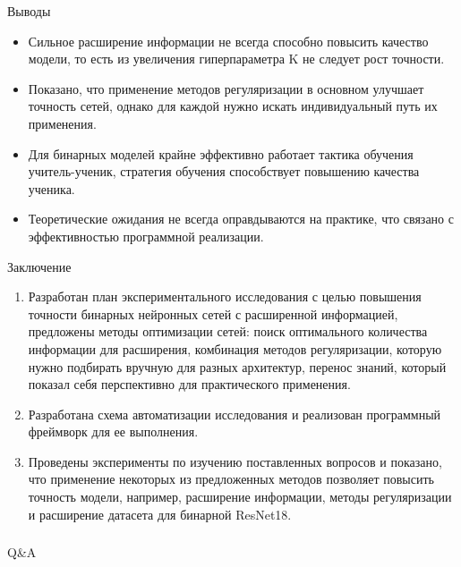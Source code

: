\documentclass[usenames,dvipsnames, 10pt]{beamer}
\begin{document}
\begin{frame}{Выводы}
    \begin{itemize}
        \item Сильное расширение информации не всегда способно повысить качество модели, то есть из увеличения гиперпараметра K не следует рост точности.
        \vskip 0.3cm
        \item Показано, что применение методов регуляризации в основном улучшает точность сетей, однако для каждой нужно искать индивидуальный путь их применения.
        \vskip 0.3cm
        \item Для бинарных моделей крайне эффективно работает тактика обучения учитель-ученик, стратегия обучения способствует повышению качества ученика.
        \vskip 0.3cm
        \item Теоретические ожидания не всегда оправдываются на практике, что связано с эффективностью программной реализации.
    \end{itemize}
\end{frame}

\begin{frame}{Заключение}
\vskip -0.5cm
\begin{enumerate}
    \item Разработан план экспериментального исследования с целью повышения точности бинарных нейронных сетей с расширенной информацией, предложены методы оптимизации сетей: поиск оптимального количества информации для расширения, комбинация методов регуляризации, которую нужно подбирать вручную для разных архитектур, перенос знаний, который показал себя перспективно для практического применения.
    \vskip 0.5cm
    \item Разработана схема автоматизации исследования и реализован программный фреймворк для ее выполнения.
    \vskip 0.5cm
    \item Проведены эксперименты по изучению поставленных вопросов и показано, что применение некоторых из предложенных методов позволяет повысить точность модели, например, расширение информации, методы регуляризации и расширение датасета для бинарной ResNet18.
\end{enumerate}
\end{frame}

\begin{frame}
\frametitle{\phatom}
    \centering
    \Large
    Q\&A 
\end{frame}
\end{document}

